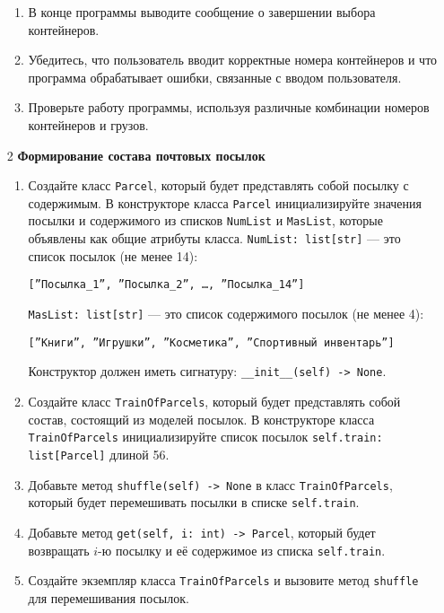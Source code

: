 \begin{enumerate}
\begin{enumerate}
    \item В конце программы выводите сообщение о завершении выбора контейнеров.

    \item Убедитесь, что пользователь вводит корректные номера контейнеров и что программа обрабатывает ошибки, связанные с вводом пользователя.

    \item Проверьте работу программы, используя различные комбинации номеров контейнеров и грузов.
\end{enumerate}

\item[2] \textbf{Формирование состава почтовых посылок}
\begin{enumerate}
    \item Создайте класс \texttt{Parcel}, который будет представлять собой посылку с содержимым. В конструкторе класса \texttt{Parcel} инициализируйте значения посылки и содержимого из списков \texttt{NumList} и \texttt{MasList}, которые объявлены как общие атрибуты класса. \texttt{NumList: list[str]} — это список посылок (не менее 14): 
    \begin{center}
        \texttt{[''Посылка\_1'', ''Посылка\_2'', \dots, ''Посылка\_14'']}
    \end{center}
    \texttt{MasList: list[str]} — это список содержимого посылок (не менее 4):
    \begin{center}
        \texttt{[''Книги'', ''Игрушки'', ''Косметика'', ''Спортивный инвентарь'']}
    \end{center}
    Конструктор должен иметь сигнатуру: \texttt{\_\_init\_\_(self) -> None}.

    \item Создайте класс \texttt{TrainOfParcels}, который будет представлять собой состав, состоящий из моделей посылок. В конструкторе класса \texttt{TrainOfParcels} инициализируйте список посылок \texttt{self.train: list[Parcel]} длиной 56.

    \item Добавьте метод \texttt{shuffle(self) -> None} в класс \texttt{TrainOfParcels}, который будет перемешивать посылки в списке \texttt{self.train}.

    \item Добавьте метод \texttt{get(self, i: int) -> Parcel}, который будет возвращать $i$-ю посылку и её содержимое из списка \texttt{self.train}.

    \item Создайте экземпляр класса \texttt{TrainOfParcels} и вызовите метод \texttt{shuffle} для перемешивания посылок.


\end{enumerate}
\end{enumerate}
